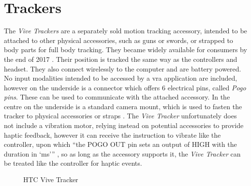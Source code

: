 \section{Trackers}
The \textit{Vive Trackers} are a separately sold motion tracking accessory, intended to be attached to other physical accessories, such as guns or swords, or strapped to body parts for full body tracking. They became widely available for consumers by the end of 2017 \autocite{viveTrackerLaunch}.
\newline
Their position is tracked the same way as the controllers and headset. They also connect wirelessly to the computer and are battery powered. No input modalities intended to be accessed by a \gls{vra} application are included, however on the underside is a connector which offers 6 electrical pins, called \textit{Pogo pins}. These can be used to communicate with the attached accessory. In the centre on the underside is a standard camera mount, which is used to fasten the tracker to physical accessories or straps \autocite{viveTrackerDevGuide}.
\newline
The \textit{Vive Tracker} unfortunately does not include a vibration motor, relying instead on potential accessories to provide haptic feedback, however it can receive the instruction to vibrate like the controller, upon which \enquote{the POGO OUT pin sets an output of HIGH with the duration in ‘ms’} \autocite[p. ~29]{viveTrackerDevGuide}, so as long as the accessory supports it, the \textit{Vive Tracker} can be treated like the controller for haptic events.
\begin{figure}[h]
    \centering
    \hfill
    \hfill
    \caption{HTC Vive Tracker}
    \label{fig:tracker}
\end{figure}